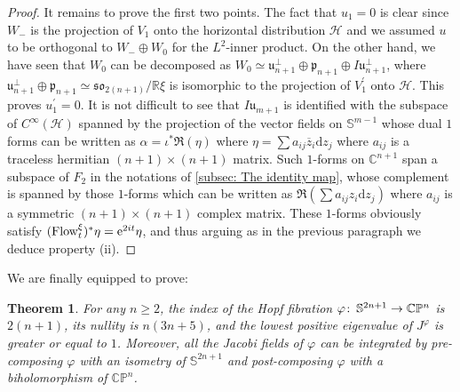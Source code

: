 \documentclass{article}
\numberwithin{equation}{section}        %
\theoremstyle{bfnote}
\newtheorem{thm}{Theorem}[section]          %
\theoremstyle{definition}
\theoremstyle{bfremark}
\newcommand{\col}{\colon \thinspace}        %
\newcommand{\R}{\mathbb{R}}                 %
\newcommand{\C}{\mathbb{C}}                 %
\renewcommand{\P}{\mathbb{P}}               %
\newcommand{\Sp}{\mathbb{S}}                %
\newcommand{\diff}{\mathrm{d}}                      %
\begin{document}
\begin{proof}
    It remains to prove the first two points. The fact that $u_1 = 0$ is clear since $W_-$ is the projection of $V_1$ onto the horizontal distribution $\mathscr H$ and we assumed $u$ to be orthogonal to $W_- \oplus W_0$ for the $L^2$-inner product. On the other hand, we have seen that $W_0$ can be decomposed as $W_0 \simeq \mathfrak{u}_{n+1}^\perp \oplus \mathfrak{p}_{n+1} \oplus I \mathfrak{u}_{n+1}^\perp$, where $\mathfrak{u}_{n+1}^\perp \oplus \mathfrak{p}_{n+1} \simeq \mathfrak{so}_{2(n+1)} / \R \xi$ is isomorphic to the projection of $V^\prime_1$ onto $\mathscr H$. This proves $u_1^\prime = 0$. It is not difficult to see that $I\mathfrak{u}_{m+1}$ is identified with the subspace of $C^\infty(\mathscr H)$ spanned by the projection of the vector fields on $\Sp^{m-1}$ whose dual $1$ forms can be written as $\alpha = \iota^* \Re(\eta)$ where $\eta = \sum a_{ij} \overline{z}_i\diff z_j$ where $a_{ij}$ is a traceless hermitian $(n+1) \times (n+1)$ matrix. Such $1$-forms on $\C^{n+1}$ span a subspace of $F_2$ in the notations of \cref{subsec: The identity map}, whose complement is spanned by those $1$-forms which can be written as $\Re(\sum a_{ij} z_i \diff z_j)$ where $a_{ij}$ is a symmetric $(n+1) \times (n+1)$ complex matrix. These $1$-forms obviously satisfy $(\textup{Flow}_{t}^\xi)^* \eta = \mathrm{e}^{2it} \eta$, and thus arguing as in the previous paragraph we deduce property (ii). 
\end{proof}

We are finally equipped to prove:

\begin{thm}
    For any $n \geq 2$, the index of the Hopf fibration $\varphi \col \Sp^{2n+1} \to \C\P^n$ is $2(n+1)$, its nullity is $n(3n+5)$, and the lowest positive eigenvalue of $J^\varphi$ is greater or equal to $1$. Moreover, all the Jacobi fields of $\varphi$ can be integrated by pre-composing $\varphi$ with an isometry of $\Sp^{2n+1}$ and post-composing $\varphi$ with a biholomorphism of $\mathbb{CP}^n$.
\end{thm}
\end{document}
